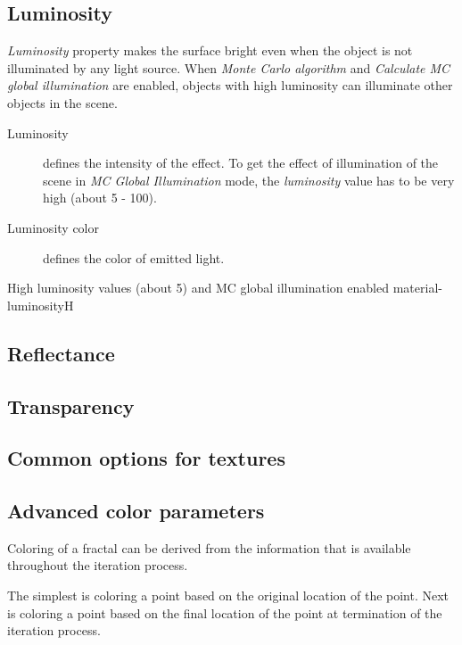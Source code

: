 \subsection{Luminosity}\label{materials-luminosity}

\emph{Luminosity} property makes the surface bright even when the object is not illuminated by any light source. When \emph{Monte Carlo algorithm} and \emph{Calculate MC global illumination} are enabled, objects with high luminosity can illuminate other objects in the scene. 

\begin{description}
	\item[Luminosity] defines the intensity of the effect. To get the effect of illumination of the scene in\emph{ MC Global Illumination} mode, the \emph{luminosity} value has to be very high (about 5 - 100). 
	\item[Luminosity color] defines the color of emitted light.
\end{description}

{High luminosity values (about 5) and MC global illumination enabled}
{material-luminosity}{H}

\subsection{Reflectance}\label{materials-reflectance}

\subsection{Transparency}\label{materials-transparency}

\subsection{Common options for textures}\label{materials-textures}

\subsection{Advanced color parameters}\label{materials-advanced-color-parameters}

Coloring of a fractal can be derived from the information that is available throughout the iteration process.

The simplest is coloring a point based on the original location of the point.
Next is coloring a point based on the final location of the point at termination of the iteration process.


